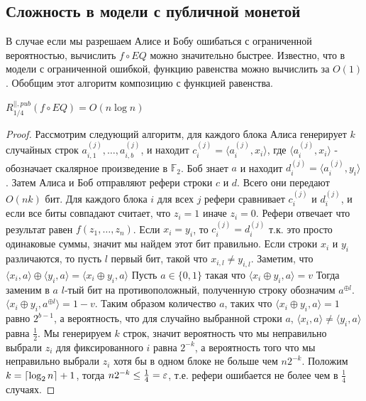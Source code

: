 \documentclass{article}
\begin{document}
\subsection{Сложность в модели с публичной монетой}
\label{sec:eqpub}
В случае если мы разрешаем Алисе и Бобу ошибаться с ограниченной вероятностью, вычислить $f \circ EQ$ можно значительно быстрее. Известно, что в модели с ограниченной ошибкой, функцию равенства можно вычислить за $O(1)$. Обобщим этот алгоритм композицию с функцией равенства. 
\begin{theorem}
    $R^{||, pub}_{1/4}(f \circ EQ) = O(n \log n)$
    \begin{proof}
        Рассмотрим следующий алгоритм, для каждого блока Алиса генерирует $k$ случайных строк $a^{(j)}_{i,1}, \ldots, a^{(j)}_{i,b}$, и находит $c^{(j)}_i = \langle a^{(j)}_i, x_i \rangle$, где $\langle a^{(j)}_i, x_i \rangle$ - обозначает скалярное произведение в $\mathbb{F}_2$. Боб знает $a$ и находит $d^{(j)}_i = \langle a^{(j)}_i, y_i \rangle$. Затем Алиса и Боб отправляют рефери строки $c$ и $d$. Всего они передают $O(nk)$ бит. Для каждого блока $i$ для всех $j$ рефери сравнивает $c^{(j)}_i$ и $d^{(j)}_i$, и если все биты совпадают считает, что $z_i = 1$ иначе $z_i = 0$. Рефери отвечает что результат равен $f(z_1, \ldots, z_n)$. Если $x_i = y_i$, то $c^{(j)}_i = d^{(j)}_i$ т.к. это просто одинаковые суммы, значит мы найдем этот бит правильно. Если строки $x_i$ и $y_i$ различаются, то пусть $l$ первый бит, такой что $x_{i, l} \neq y_{i, l}$. Заметим, что $\langle x_i, a \rangle \oplus \langle y_i, a\rangle = \langle x_i \oplus y_i, a\rangle$ Пусть $a \in \{0, 1\}$ такая что $\langle x_i \oplus y_i, a \rangle = v$ Тогда заменим в $a$ $l$-тый бит на противоположный, полученную строку обозначим $a^{\oplus l}$. $\langle x_i \oplus y_i, a^{\oplus l} \rangle = 1 - v$. Таким образом количество $a$, таких что $\langle x_i \oplus y_i, a \rangle = 1$ равно $2^{b-1}$, а вероятность, что для случайно выбранной строки $a$, $\langle x_i, a \rangle \neq \langle y_i, a\rangle$ равна $\frac{1}{2}$. Мы генерируем $k$ строк, значит вероятность что мы неправильно выбрали $z_i$ для фиксированного $i$ равна $2^{-k}$, а вероятность того что мы неправильно выбрали $z_i$ хотя бы в одном блоке не больше чем $n2^{-k}$. Положим $k = \lceil\log_2 n\rceil + 1$, тогда $n2^{-k} \leq \frac{1}{4} = \varepsilon$, т.е. рефери ошибается не более чем в $\frac{1}{4}$ случаях.        
    \end{proof}
\end{theorem}   
\end{document}
